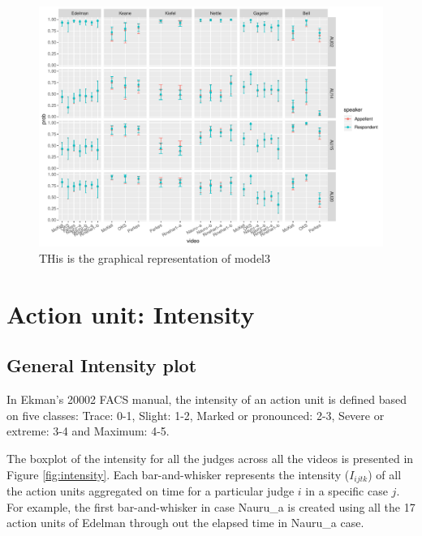 \documentclass{monashthesis}
\begin{document}
\begin{figure}

{\centering \includegraphics[width=1\linewidth]{figures/unnamed-chunk-13-1} 

}

\caption{THis is the graphical representation of model3\label{fig:model_3_plot}}\label{fig:unnamed-chunk-13}
\end{figure}

\hypertarget{action-unit-intensity}{%
\section{Action unit: Intensity}\label{action-unit-intensity}}

\hypertarget{general-intensity-plot}{%
\subsection{General Intensity plot}\label{general-intensity-plot}}

In Ekman's 20002 FACS manual, the intensity of an action unit is defined based on five classes: Trace: 0-1, Slight: 1-2, Marked or pronounced: 2-3, Severe or extreme: 3-4 and Maximum: 4-5.

The boxplot of the intensity for all the judges across all the videos is presented in Figure \ref{fig:intensity}. Each bar-and-whisker represents the intensity (\(I_{ijtk}\)) of all the action units aggregated on time for a particular judge \(i\) in a specific case \(j\). For example, the first bar-and-whisker in case Nauru\_a is created using all the 17 action units of Edelman through out the elapsed time in Nauru\_a case.
\end{document}
